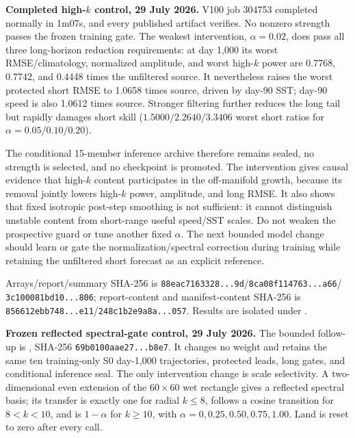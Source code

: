 \documentclass[11pt]{article}
\begin{document}
\textbf{Completed high-\(k\) control, 29 July 2026.}  V100 job 304753
completed normally in 1m07s, and every published artifact verifies.  No
nonzero strength passes the frozen training gate.  The weakest intervention,
\(\alpha=0.02\), does pass all three long-horizon reduction requirements:
at day 1,000 its worst RMSE/climatology, normalized amplitude, and worst
high-\(k\) power are 0.7768, 0.7742, and 0.4448 times the unfiltered source.
It nevertheless raises the worst protected short RMSE to 1.0658 times source,
driven by day-90 SST; day-90 speed is also 1.0612 times source.  Stronger
filtering further reduces the long tail but rapidly damages short skill
(\(1.5000/2.2640/3.3406\) worst short ratios for
\(\alpha=0.05/0.10/0.20\)).

The conditional 15-member inference archive therefore remains sealed, no
strength is selected, and no checkpoint is promoted.  The intervention gives
causal evidence that high-\(k\) content participates in the off-manifold
growth, because its removal jointly lowers high-\(k\) power, amplitude, and
long RMSE.  It also shows that fixed isotropic post-step smoothing is not
sufficient: it cannot distinguish unstable content from short-range useful
speed/SST scales.  Do not weaken the prospective guard or tune another fixed
\(\alpha\).  The next bounded model change should learn or gate the
normalization/spectral correction during training while retaining the
unfiltered short forecast as an explicit reference.

Arrays/report/summary SHA-256 is
\texttt{88eac7163328...9d}/\texttt{8ca08f114763...a66}/
\texttt{3c100081bd10...806}; report-content and manifest-content SHA-256
is \texttt{856612ebb748...e11}/\texttt{248c1b2e9a8a...057}.  Results are
isolated under
.

\textbf{Frozen reflected spectral-gate control, 29 July 2026.}  The bounded
follow-up is
, SHA-256
\texttt{69b0100aae27...b8e7}.  It changes no weight and retains the same ten
training-only S0 day-1,000 trajectories, protected leads, long gates, and
conditional inference seal.  The only intervention change is scale
selectivity.  A two-dimensional even extension of the \(60\times60\) wet
rectangle gives a reflected spectral basis; its transfer is exactly one for
radial \(k\leq8\), follows a cosine transition for \(8<k<10\), and is
\(1-\alpha\) for \(k\geq10\), with
\(\alpha=0,0.25,0.50,0.75,1.00\).  Land is reset to zero after every call.
\end{document}
